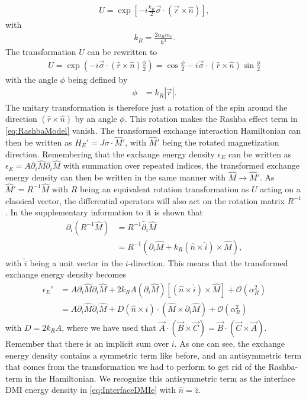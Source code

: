 \documentclass[12pt, a4paper]{article}		%
\DeclareRobustCommand{\orderof}{\ensuremath{\mathcal{O}}}
\numberwithin{equation}{section}
\begin{document}
\begin{align}
U = \exp{\left[-i \frac{k_R}{2}\vec{\sigma}\cdot(\vec{r}\times\hat{n})\right]},
\end{align}
with
\begin{align}
k_R = \frac{2\alpha_R m_e}{\hbar^2}.
\end{align}
The transformation $U$ can be rewritten to
\begin{align}
U = \exp{(-i\vec{\sigma}\cdot(\hat{r}\times\hat{n}) \frac{\phi}{2})} = \cos{\frac{\phi}{2}} - i\vec{\sigma}\cdot(\hat{r}\times\hat{n})\sin{\frac{\phi}{2}}
\end{align}
with the angle $\phi$ being defined by
\begin{align}
\phi &= k_R |\vec{r}|.
\end{align}
The unitary transformation is therefore just a rotation of the spin around the direction $(\hat{r}\times\hat{n})$ by an angle $\phi$. This rotation makes the Rashba effect term in \eqref{eq:RashbaModel} vanish. The transformed exchange interaction Hamiltonian can then be written as $H_E' = J\sigma\cdot\hat{M}'$, with $\hat{M}'$ being the rotated magnetization direction. Remembering that the exchange energy density $\epsilon_E$ can be written as $\epsilon_E = A \partial_i \hat{M} \partial_i \hat{M}$ with summation over repeated indices, the transformed exchange energy density can then be written in the same manner with $\hat{M} \rightarrow \hat{M}'$. As $\hat{M}' = R^{-1}\hat{M}$ with $R$ being an equivalent rotation transformation as $U$ acting on a classical vector, the differential operators will also act on the rotation matrix $R^{-1}$. In the supplementary information to \cite{DMIfromRashba_Kim} it is shown that
\begin{align}
\partial_i (R^{-1}\hat{M}) &= R^{-1}\tilde{\partial_i} \hat{M} \\
&= R^{-1} (\partial_i\hat{M} + k_R(\hat{n}\times\hat{i})\times\hat{M}),
\end{align}
with $\hat{i}$ being a unit vector in the $i$-direction. This means that the transformed exchange energy density becomes
\begin{align}
\nonumber \epsilon_E' &= A\partial_i \hat{M} \partial_i \hat{M} + 2k_RA(\partial_i\hat{M})\left[(\hat{n}\times\hat{i})\times\hat{M}\right] + \orderof(\alpha_R^2) \\
&= A\partial_i \hat{M} \partial_i \hat{M} + D (\hat{n}\times\hat{i}) \cdot (\hat{M}\times\partial_i\hat{M}) + \orderof(\alpha_R^2) \label{eq:exchEnDensDM}
\end{align}
with $D = 2k_RA$, where we have used that $\vec{A}\cdot(\vec{B}\times\vec{C}) = \vec{B}\cdot(\vec{C}\times\vec{A})$. Remember that there is an implicit sum over $i$. As one can see, the exchange energy density contains a symmetric term like before, and an antisymmetric term that comes from the transformation we had to perform to get rid of the Rashba-term in the Hamiltonian. We recognize this antisymmetric term as the interface DMI energy density in \eqref{eq:InterfaceDMIe} with $\hat{n} = \hat{z}$.
\end{document}
